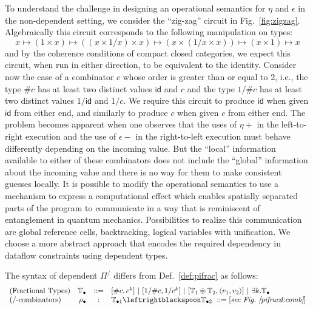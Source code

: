 \documentclass[a4paper,USenglish]{lipics-v2016-utf8x}
\newcommand{\hash}{\#}
\newcommand{\alt}{~|~}
\newcommand{\order}[1]{\hash #1}
\newcommand{\iorder}[1]{1/\hash #1}
\newcommand{\idiso}{\mathsf{{id}}}
\begin{document}
To understand the challenge in designing an operational semantics for $\eta$ and
$\epsilon$ in the non-dependent setting, we consider the ``zig-zag'' circuit in
Fig.~\ref{fig:zigzag}. Algebraically this circuit corresponds to the following
manipulation on types:
\[
x \mapsto (1 \times x) \mapsto ((x \times 1/x) \times x)
\mapsto (x \times (1/x \times x)) \mapsto (x \times 1) \mapsto x
\]
and by the coherence conditions of compact closed categories, we expect this
circuit, when run in either direction, to be equivalent to the
identity. Consider now the case of a combinator $c$ whose order is greater than
or equal to 2, i.e., the type $\order{c}$ has at least two distinct values
$\idiso$ and $c$ and the type $\iorder{c}$ has at least two distinct values
$1/\idiso$ and $1/c$. We require this circuit to produce $\idiso$ when given
$\idiso$ from either end, and similarly to produce $c$ when given $c$ from
either end. The problem becomes apparent when one observes that the uses of
$\eta+$ in the left-to-right execution and the use of $\epsilon-$ in the
right-to-left execution must behave differently depending on the incoming
value. But the ``local'' information available to either of these combinators
does not include the ``global'' information about the incoming value and there
is no way for them to make consistent guesses locally. It is possible to modify
the operational semantics to use a mechanism to express a computational effect
which enables spatially separated parts of the program to communicate in a way
that is reminiscent of entanglement in quantum mechanics. Possibilities to
realize this communication are global reference cells, backtracking, logical
variables with unification. We choose a more abstract approach that encodes the
required dependency in dataflow constraints using dependent types.

\begin{definition}[Dependent $\Pi^/$]
\label{def:pifracd}
The syntax of dependent $\Pi^/$ differs from Def.~\ref{def:pifrac} as follows:
\[\begin{array}{lrcl}
(\textrm{Fractional Types}) & \mathbb{T_\bullet} &::=&
  [\order{c},c^k] \alt
  [\iorder{c},1/c^k] \alt
  [\mathbb{T}_1 \circledast \mathbb{T}_2,\langle v_1,v_2 \rangle] \alt
  \exists k.\mathbb{T_\bullet} \\
 (\textrm{/-combinators}) & \rho_\bullet &:&
  \mathbb{T}_{\bullet 1} \leftrightblackspoon \mathbb{T}_{\bullet 2} ~::=
  [\textit{see Fig.~\ref{pifracd:comb}}]
\end{array}\]
\end{definition}
\end{document}
